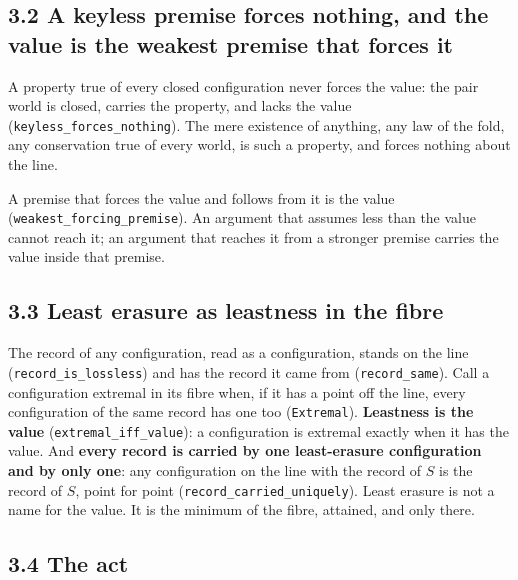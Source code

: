 \documentclass[10pt,twocolumn]{article}
\begin{document}
\hypertarget{a-keyless-premise-forces-nothing-and-the-value-is-the-weakest-premise-that-forces-it}{%
\subsection{3.2 A keyless premise forces nothing, and the value is the
weakest premise that forces
it}\label{a-keyless-premise-forces-nothing-and-the-value-is-the-weakest-premise-that-forces-it}}

A property true of every closed configuration never forces the value:
the pair world is closed, carries the property, and lacks the value
(\texttt{keyless\_\allowbreak{}forces\_\allowbreak{}nothing}). The mere existence of anything, any
law of the fold, any conservation true of every world, is such a
property, and forces nothing about the line.

A premise that forces the value and follows from it is the value
(\texttt{weakest\_\allowbreak{}forcing\_\allowbreak{}premise}). An argument that assumes less than
the value cannot reach it; an argument that reaches it from a stronger
premise carries the value inside that premise.

\hypertarget{least-erasure-as-leastness-in-the-fibre}{%
\subsection{3.3 Least erasure as leastness in the
fibre}\label{least-erasure-as-leastness-in-the-fibre}}

The record of any configuration, read as a configuration, stands on the
line (\texttt{record\_\allowbreak{}is\_\allowbreak{}lossless}) and has the record it came from
(\texttt{record\_\allowbreak{}same}). Call a configuration extremal in its fibre
when, if it has a point off the line, every configuration of the same
record has one too (\texttt{Extremal}). \textbf{Leastness is the value}
(\texttt{extremal\_\allowbreak{}iff\_\allowbreak{}value}): a configuration is extremal exactly
when it has the value. And \textbf{every record is carried by one
least-erasure configuration and by only one}: any configuration on the
line with the record of \(S\) is the record of \(S\), point for point
(\texttt{record\_\allowbreak{}carried\_\allowbreak{}uniquely}). Least erasure is not a name for
the value. It is the minimum of the fibre, attained, and only there.

\hypertarget{the-act}{%
\subsection{3.4 The act}\label{the-act}}
\end{document}
